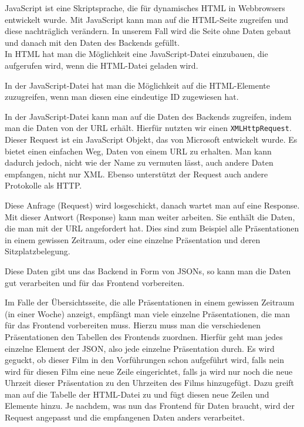 	JavaScript ist eine Skriptsprache, die für dynamisches HTML in Webbrowsers entwickelt wurde. Mit JavaScript kann man auf die \ac{HTML}-Seite zugreifen und diese nachträglich verändern. In unserem Fall wird die Seite ohne Daten gebaut und danach mit den Daten des Backends gefüllt. 
	\\In \ac{HTML} hat man die Möglichkeit eine JavaScript-Datei einzubauen, die aufgerufen wird, wenn die HTML-Datei geladen wird. 

	In der JavaScript-Datei hat man die Möglichkeit auf die \ac{HTML}-Elemente zuzugreifen, wenn man diesen eine eindeutige \ac{ID} zugewiesen hat. 

	
	In der JavaScript-Datei kann man auf die Daten des Backends zugreifen, indem man die Daten von der \ac{URL} erhält. Hierfür nutzten wir einen \texttt{XMLHttpRequest}. Dieser Request ist ein JavaScript Objekt, das von Microsoft entwickelt wurde. Es bietet einen einfachen Weg, Daten von einem \ac{URL} zu erhalten. Man kann dadurch jedoch, nicht wie der Name zu vermuten lässt, auch andere Daten empfangen, nicht nur XML. Ebenso unterstützt der Request auch andere Protokolle als \ac{HTTP}.
	
	Diese Anfrage (Request) wird losgeschickt, danach wartet man auf eine Response. Mit dieser Antwort (Response) kann man weiter arbeiten. Sie enthält die Daten, die man mit der \ac{URL} angefordert hat. Dies sind zum Beispiel alle Präsentationen in einem gewissen Zeitraum, oder eine einzelne Präsentation und deren Sitzplatzbelegung.

	Diese Daten gibt uns das Backend in Form von JSONs, so kann man die Daten gut verarbeiten und für das Frontend vorbereiten. 

	
	Im Falle der Übersichtsseite, die alle Präsentationen in einem gewissen Zeitraum (in einer Woche) anzeigt, empfängt man viele einzelne Präsentationen, die man für das Frontend vorbereiten muss. Hierzu muss man die verschiedenen Präsentationen den Tabellen des Frontends zuordnen. Hierfür geht man jedes einzelne Element der JSON, also jede einzelne Präsentation durch. Es wird geguckt, ob dieser Film in den Vorführungen schon aufgeführt wird, falls nein wird für diesen Film eine neue Zeile eingerichtet, falls ja wird nur noch die neue Uhrzeit dieser Präsentation zu den Uhrzeiten des Films hinzugefügt. Dazu greift man auf die Tabelle der \ac{HTML}-Datei zu und fügt diesen neue Zeilen und Elemente hinzu. Je nachdem, was nun das Frontend für Daten braucht, wird der Request angepasst und die empfangenen Daten anders verarbeitet.
	
